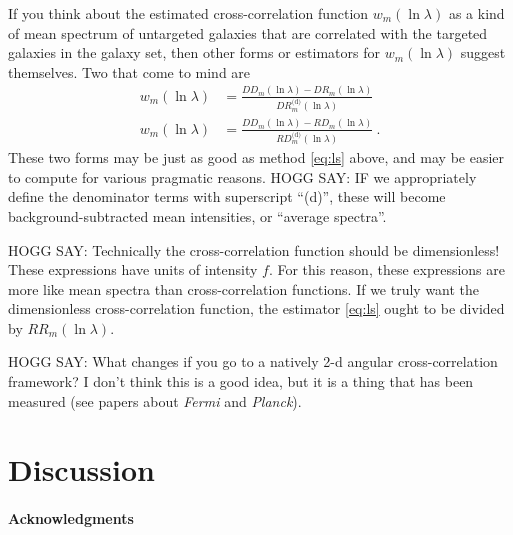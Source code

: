 \documentclass{article}
\newcommand{\project}[1]{\textsl{#1}}
\begin{document}
If you think about the estimated cross-correlation function $w_m(\ln\lambda)$ as a kind of mean spectrum of untargeted galaxies that are correlated with the targeted galaxies in the galaxy set, then other forms or estimators for $w_m(\ln\lambda)$ suggest themselves.
Two that come to mind are
\begin{align}
    w_m(\ln\lambda) &= \frac{DD_m(\ln\lambda) - DR_m(\ln\lambda)}{DR^\text{(d)}_m(\ln\lambda)} \\
    w_m(\ln\lambda) &= \frac{DD_m(\ln\lambda) - RD_m(\ln\lambda)}{RD^\text{(d)}_m(\ln\lambda)} ~.
\end{align}
These two forms may be just as good as method \eqref{eq:ls} above, and may be easier to compute for various pragmatic reasons.
HOGG SAY: IF we appropriately define the denominator terms with superscript ``(d)'', these will become background-subtracted mean intensities, or ``average spectra''.

HOGG SAY: Technically the cross-correlation function should be dimensionless!
These expressions have units of intensity $f$.
For this reason, these expressions are more like mean spectra than cross-correlation functions.
If we truly want the dimensionless cross-correlation function, the estimator \eqref{eq:ls} ought to be divided by $RR_m(\ln\lambda)$.

HOGG SAY: What changes if you go to a natively 2-d angular cross-correlation framework?
I don't think this is a good idea, but it is a thing that has been measured (see papers about \project{Fermi} and \project{Planck}).

\section{Discussion}\label{sec:discussion}

\paragraph{Acknowledgments}


\end{document}
